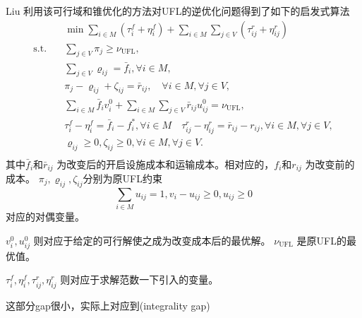 \documentclass[UTF8]{article}
\begin{document}
Liu 利用该可行域和锥优化的方法对UFL的逆优化问题得到了如下的启发式算法
\begin{equation}
\begin{aligned}
&\min \sum_{i \in M} \left(\tau_{i}^{f}+\eta_{i}^{f}\right)+\sum_{i \in M} \sum_{j \in V} \left(\tau_{i j}^r+\eta_{i j}^{r}\right) \\
\text{s.t.} \quad &\sum_{j \in V} \pi_{j} \geq \nu_{\mathrm{UFL}}, \\
&\sum_{j \in V} \varrho_{i j}=\bar{f}_{i}, \forall i \in M, \\
&\pi_{j}-\varrho_{i j}+\zeta_{i j}=\bar{r}_{i j}, \quad \forall i \in M, \forall j \in V, \\
&\sum_{i \in M} \bar{f}_{i} v_{i}^{0}+\sum_{i \in M} \sum_{j \in V} \bar{r}_{i j} u_{i j}^{0}=\nu_{\mathrm{UFL}}, \\
& \tau_{i}^{f}-\eta_{i}^{f}=\bar{f}_{i}-f_{i}^{*}, \forall i \in M \quad \tau_{i j}^{r}-\eta_{i j}^{r}=\bar{r}_{i j}-r_{i j}, \forall i \in M, \forall j \in V, \\
& \varrho_{i j} \geq 0, \zeta_{i j} \geq 0, \forall i \in M, \forall j \in V. \\
\end{aligned}
\end{equation}
其中$\bar{f}_{i}$和$\bar{r}_{ij}$ 为改变后的开启设施成本和运输成本。相对应的，$f_{i}$和$r_{ij}$ 为改变前的成本。
$\pi_{j},\varrho_{i j},\zeta_{i j}$分别为原UFL约束
\begin{equation*}
\sum_{i \in M} u_{ij} = 1,
v_i - u_{ij} \geq 0,
u_{ij} \geq 0
\end{equation*}
对应的对偶变量。 \par
$v_{i}^{0},u_{i j}^{0}$ 则对应于给定的可行解使之成为改变成本后的最优解。
$\nu_{\mathrm{UFL}}$ 是原UFL的最优值。

$\tau_{i}^{f},\eta_{i}^{f},\tau_{i j}^r,\eta_{i j}^{r}$ 则对应于求解范数一下引入的变量。 \par


这部分gap很小，实际上对应到(integrality gap)

%
%
\end{document}
